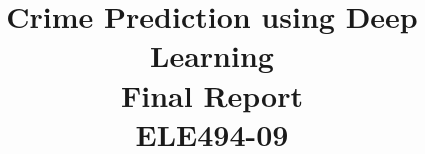 \documentclass[conference]{IEEEtran}
\begin{document}
%
\title{Crime Prediction using Deep Learning\\[0.3cm]
\large Final Report\\
ELE494-09}

\author{
\and
{}
}


% 








\maketitle
\end{document}
